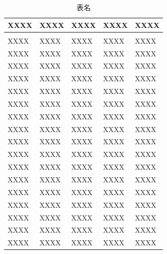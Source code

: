 

\begin{longtable}{*{5}{B{65.95bp}}}
  \caption{表名}\label{tab:table12}\\
  \toprule
  XXXX & XXXX & XXXX & XXXX & XXXX \\
  \midrule
  \endfirsthead

   \\
  \toprule
  XXXX & XXXX & XXXX & XXXX & XXXX \\
  \midrule
  \endhead

  \thesisbottomrule
  \endfoot

  \thesisbottomrule
  \endlastfoot

  XXXX & XXXX & XXXX & XXXX & XXXX \\
  XXXX & XXXX & XXXX & XXXX & XXXX \\
  XXXX & XXXX & XXXX & XXXX & XXXX \\
  XXXX & XXXX & XXXX & XXXX & XXXX \\
  XXXX & XXXX & XXXX & XXXX & XXXX \\
  XXXX & XXXX & XXXX & XXXX & XXXX \\
  XXXX & XXXX & XXXX & XXXX & XXXX \\
  XXXX & XXXX & XXXX & XXXX & XXXX \\
  XXXX & XXXX & XXXX & XXXX & XXXX \\
  XXXX & XXXX & XXXX & XXXX & XXXX \\
  XXXX & XXXX & XXXX & XXXX & XXXX \\
  XXXX & XXXX & XXXX & XXXX & XXXX \\
  XXXX & XXXX & XXXX & XXXX & XXXX \\
  XXXX & XXXX & XXXX & XXXX & XXXX \\
  XXXX & XXXX & XXXX & XXXX & XXXX \\
  XXXX & XXXX & XXXX & XXXX & XXXX \\
\end{longtable}
